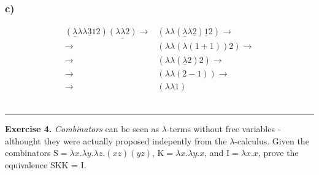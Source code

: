 \documentclass{article}
\newcommand{\lm}[1]{\lambda #1 .}
\newcommand{\qed}{\begin{flushright}\rule{0.7em}{0.7em}\end{flushright}}
\begin{document}
\subsubsection*{c)}
\begin{equation*}
\begin{array}{rl}
      (\underline{\lambda} \lambda \lambda \underline{3}12)\underline{(\lambda \lambda 2)}  \rightarrow & (\lambda \lambda (\underline{\lambda} \lambda \underline{2})\underline{1}2) \rightarrow \\  \rightarrow & (\lambda \lambda ( \lambda (1+1))2) \rightarrow \\
      \rightarrow & (\lambda \lambda (\underline{\lambda} 2)2) \rightarrow \\
      \rightarrow & (\lambda \lambda (2-1)) \rightarrow \\
      \rightarrow & (\lambda \lambda 1)
\end{array}
\end{equation*}\\

\qed
\textbf{Exercise 4.} \textit{Combinators} can be seen as $\lambda$-terms without free variables - althought they were actually proposed indepently from the $\lambda$-calculus. Given the combinators $\text{S}=\lm{x}\lm{y}\lm{z}(x z)(y z)$, $\text{K}=\lm{x}\lm{y}x$, and $\text{I}=\lm{x}x$, prove the equivalence SKK = I.
\end{document}

